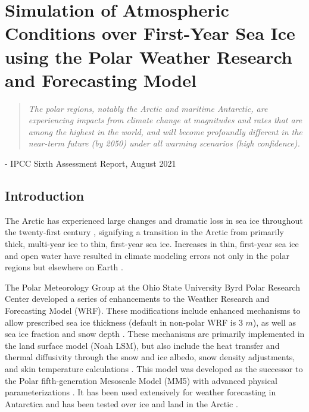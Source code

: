 \chapter{Simulation of Atmospheric Conditions over First-Year Sea Ice using the Polar Weather Research and Forecasting Model}
\vspace{1 cm}
\begin{spacing}{1} \begin{quote} 
\noindent \emph{The polar regions, notably the Arctic and maritime Antarctic, are experiencing impacts from climate change at magnitudes and rates that are among the highest in the world, and will become profoundly different in the near-term future (by 2050) under all warming scenarios (high confidence).}\end{quote}
\hspace{6 cm} - IPCC Sixth Assessment Report, August 2021  
\end{spacing}
\doublespacing
\section{Introduction}
The Arctic has experienced large changes and dramatic loss in sea ice throughout the twenty-first century \citep{hines:2015}, signifying a transition in the Arctic from primarily thick, multi-year ice to thin, first-year sea ice. Increases in thin, first-year sea ice and open water have resulted in climate modeling errors not only in the polar regions but elsewhere on Earth \citep{hines:2015, royer:1990, francis:2009}. 

The Polar Meteorology Group at the Ohio State University Byrd Polar Research Center developed a series of enhancements to the Weather Research and Forecasting Model (WRF). These modifications include enhanced mechanisms to allow prescribed sea ice thickness (default in non-polar WRF is 3 $m$), as well as sea ice fraction and snow depth \citep{hines:2015}. These mechanisms are primarily implemented in the land surface model (Noah LSM), but also include the heat transfer and thermal diffusivity through the snow and ice albedo, snow density adjustments, and skin temperature calculations \citep{tastula:2012, hines:2015}. This model was developed as the successor to the Polar fifth-generation Mesoscale Model (MM5) with advanced physical parameterizations \citep{bromwich:2009}. It has been used extensively for weather forecasting in Antarctica \citep{powers:2012} and has been tested over ice and land in the Arctic \citep{tastula:2012, bromwich:2009}. 

